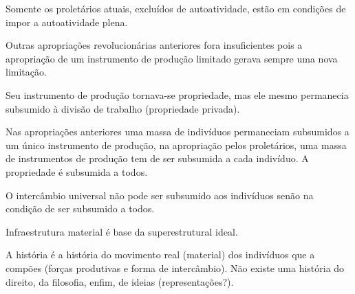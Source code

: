 \documentclass[12pt]{article}
\begin{document}
Somente os proletários atuais, excluídos de autoatividade, estão em condições de impor a autoatividade plena.

Outras apropriações revolucionárias anteriores fora insuficientes pois a apropriação de um instrumento de produção limitado gerava sempre uma nova limitação.

Seu instrumento de produção tornava-se propriedade, mas ele mesmo permanecia subsumido à divisão de trabalho (propriedade privada).

Nas apropriações anteriores uma massa de indivíduos permaneciam subsumidos a um único instrumento de produção, na apropriação pelos proletários, uma massa de instrumentos de produção tem de ser subsumida a cada indivíduo. A propriedade é subsumida a todos.

O intercâmbio universal não pode ser subsumido aos indivíduos senão na condição de ser subsumido a todos.

Infraestrutura material é base da superestrutural ideal.

A história é a história do movimento real (material) dos indivíduos que a compões (forças produtivas e forma de intercâmbio). Não existe uma história do direito, da filosofia, enfim, de ideias (representações?).
\end{document}
